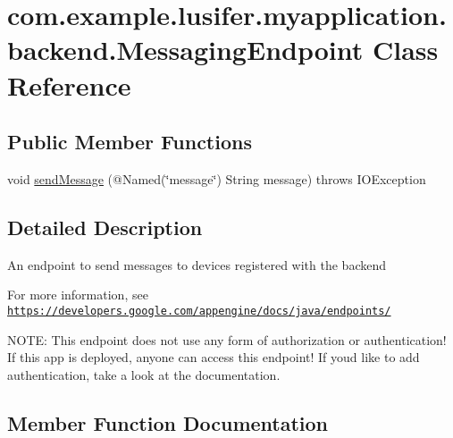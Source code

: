 \hypertarget{classcom_1_1example_1_1lusifer_1_1myapplication_1_1backend_1_1_messaging_endpoint}{}\section{com.\+example.\+lusifer.\+myapplication.\+backend.\+Messaging\+Endpoint Class Reference}
\label{classcom_1_1example_1_1lusifer_1_1myapplication_1_1backend_1_1_messaging_endpoint}
\subsection*{Public Member Functions}
\begin{DoxyCompactItemize}
\item 
void \hyperlink{classcom_1_1example_1_1lusifer_1_1myapplication_1_1backend_1_1_messaging_endpoint_a9d8e88530517dd4dee9f22c4880d54b0}{send\+Message} (@Named(\char`\"{}message\char`\"{}) String message)  throws I\+O\+Exception 
\end{DoxyCompactItemize}


\subsection{Detailed Description}
An endpoint to send messages to devices registered with the backend 

For more information, see \href{https://developers.google.com/appengine/docs/java/endpoints/}{\tt https\+://developers.\+google.\+com/appengine/docs/java/endpoints/} 

N\+O\+T\+E\+: This endpoint does not use any form of authorization or authentication! If this app is deployed, anyone can access this endpoint! If you\textquotesingle{}d like to add authentication, take a look at the documentation. 

\subsection{Member Function Documentation}
\hypertarget{classcom_1_1example_1_1lusifer_1_1myapplication_1_1backend_1_1_messaging_endpoint_a9d8e88530517dd4dee9f22c4880d54b0}{}
